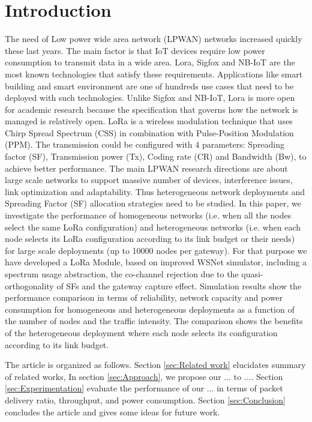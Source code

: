 \section{Introduction} \label{sec:Introduction}

The need of Low power wide area network (LPWAN) networks increased quickly these last years.
The main factor is that IoT devices require low power consumption to transmit data in a wide area.
Lora,
	Sigfox and NB-IoT are the most known technologies that satisfy these requirements.
Applications like smart building and smart environment are one of hundreds use cases that need to be deployed with such technologies.
Unlike Sigfox and NB-IoT,
	Lora is more open for academic research because the specification that governs how the network is managed is relatively open.
LoRa is a wireless modulation technique that uses Chirp Spread Spectrum (CSS) in combination with Pulse-Position Modulation (PPM).
The transmission could be configured with 4 parameters:
	Spreading factor (SF),
	Transmission power (Tx),
	Coding rate (CR) and Bandwidth (Bw),
	to achieve better performance.
The main LPWAN research directions are about large scale networks to support massive number of devices,
	interference issues,
	link optimization and adaptability.
Thus heterogeneous network deployments and Spreading Factor (SF) allocation strategies need to be studied.
In this paper,
	we investigate the performance of homogeneous networks (i.e.
when all the nodes select the same LoRa configuration) and heterogeneous networks (i.e.
when each node selects its LoRa configuration according to its link budget or their needs) for large scale deployments (up to 10000 nodes per gateway).
For that purpose we have developed a LoRa Module,
	based on improved WSNet simulator,
	including a spectrum usage abstraction,
	the co-channel rejection due to the quasi-orthogonality of SFs and the gateway capture effect.
Simulation results show the performance comparison in terms of reliability,
	network capacity and power consumption for homogeneous and heterogeneous deployments as a function of the number of nodes and the traffic intensity.
The comparison shows the benefits of the heterogeneous deployment where each node selects its configuration according to its link budget.


The article is organized as follows.
Section \ref{sec:Related work} elucidates summary of related works,
In section \ref{sec:Approach}, we propose our ... to ....
Section \ref{sec:Experimentation} evaluate the performance of our ... in terms of packet delivery ratio,
	throughput,
	and power consumption.
Section \ref{sec:Conclusion} concludes the article and gives some ideas for future work.




